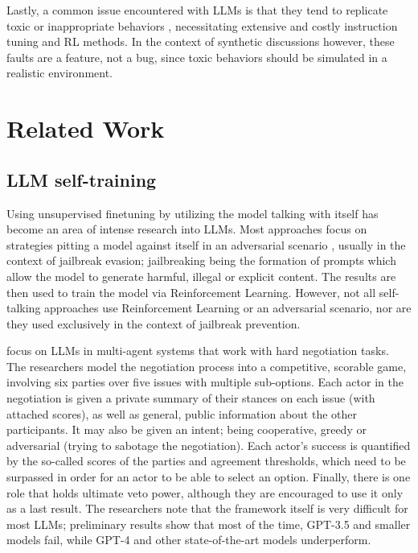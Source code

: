 Lastly, a common issue encountered with LLMs is that they tend to replicate toxic or inappropriate behaviors \cite{Birkun_Gautam_2023}, necessitating extensive and costly instruction tuning and \ac{RL} methods. In the context of synthetic discussions however, these faults are a feature, not a bug, since toxic behaviors should be simulated in a realistic environment.

\section{Related Work}
\label{sec:related:sec2}

\subsection{LLM self-training}
\label{sec:related:self-train}

Using unsupervised finetuning by utilizing the model talking with itself has become an area of intense research into LLMs. Most approaches focus on strategies pitting a model against itself in an adversarial scenario \cite{liu2024largelanguagemodelsagents, cheng2024selfplayingadversariallanguagegame, zheng2024optimalllmalignmentsusing}, usually in the context of jailbreak evasion; jailbreaking being the formation of prompts which allow the model to generate harmful, illegal or explicit content. The results are then used to train the model via Reinforcement Learning. However, not all self-talking approaches use Reinforcement Learning or an adversarial scenario, nor are they used exclusively in the context of jailbreak prevention.  

\cite{abdelnabi2024cooperationcompetitionmaliciousnessllmstakeholders} focus on LLMs in multi-agent systems that work with hard negotiation tasks. The researchers model the negotiation process into a competitive, scorable game, involving six parties over five issues with multiple sub-options. Each actor in the negotiation is given a private summary of their stances on each issue (with attached scores), as well as general, public information about the other participants. It may also be given an intent; being cooperative, greedy or adversarial (trying to sabotage the negotiation). Each actor's success is quantified by the so-called scores of the parties and agreement thresholds, which need to be surpassed in order for an actor to be able to select an option. Finally, there is one role that holds ultimate veto power, although they are encouraged to use it only as a last result. The researchers note that the framework itself is very difficult for most LLMs; preliminary results show that most of the time, GPT-3.5 and smaller models fail, while GPT-4 and other state-of-the-art models underperform.

